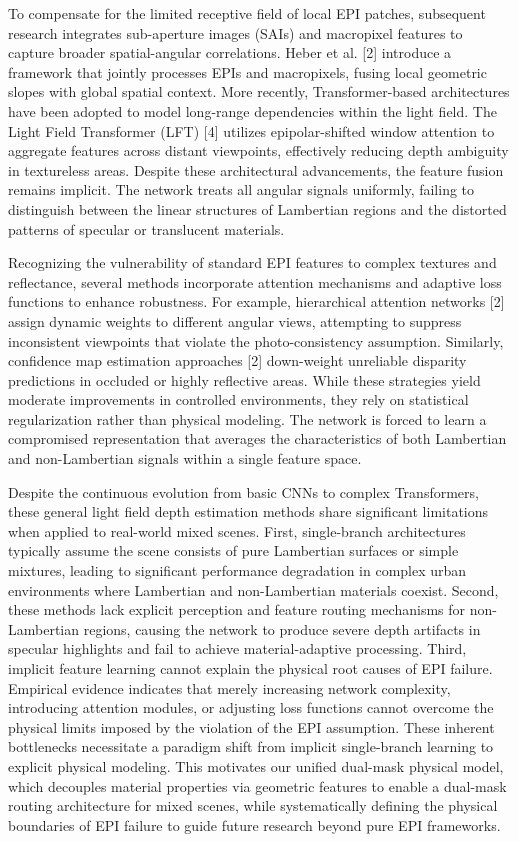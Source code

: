 To compensate for the limited receptive field of local EPI patches, subsequent research integrates sub-aperture images (SAIs) and macropixel features to capture broader spatial-angular correlations. Heber et al. [2] introduce a framework that jointly processes EPIs and macropixels, fusing local geometric slopes with global spatial context. More recently, Transformer-based architectures have been adopted to model long-range dependencies within the light field. The Light Field Transformer (LFT) [4] utilizes epipolar-shifted window attention to aggregate features across distant viewpoints, effectively reducing depth ambiguity in textureless areas. Despite these architectural advancements, the feature fusion remains implicit. The network treats all angular signals uniformly, failing to distinguish between the linear structures of Lambertian regions and the distorted patterns of specular or translucent materials.

Recognizing the vulnerability of standard EPI features to complex textures and reflectance, several methods incorporate attention mechanisms and adaptive loss functions to enhance robustness. For example, hierarchical attention networks [2] assign dynamic weights to different angular views, attempting to suppress inconsistent viewpoints that violate the photo-consistency assumption. Similarly, confidence map estimation approaches [2] down-weight unreliable disparity predictions in occluded or highly reflective areas. While these strategies yield moderate improvements in controlled environments, they rely on statistical regularization rather than physical modeling. The network is forced to learn a compromised representation that averages the characteristics of both Lambertian and non-Lambertian signals within a single feature space.

Despite the continuous evolution from basic CNNs to complex Transformers, these general light field depth estimation methods share significant limitations when applied to real-world mixed scenes. First, single-branch architectures typically assume the scene consists of pure Lambertian surfaces or simple mixtures, leading to significant performance degradation in complex urban environments where Lambertian and non-Lambertian materials coexist. Second, these methods lack explicit perception and feature routing mechanisms for non-Lambertian regions, causing the network to produce severe depth artifacts in specular highlights and fail to achieve material-adaptive processing. Third, implicit feature learning cannot explain the physical root causes of EPI failure. Empirical evidence indicates that merely increasing network complexity, introducing attention modules, or adjusting loss functions cannot overcome the physical limits imposed by the violation of the EPI assumption. These inherent bottlenecks necessitate a paradigm shift from implicit single-branch learning to explicit physical modeling. This motivates our unified dual-mask physical model, which decouples material properties via geometric features to enable a dual-mask routing architecture for mixed scenes, while systematically defining the physical boundaries of EPI failure to guide future research beyond pure EPI frameworks.


